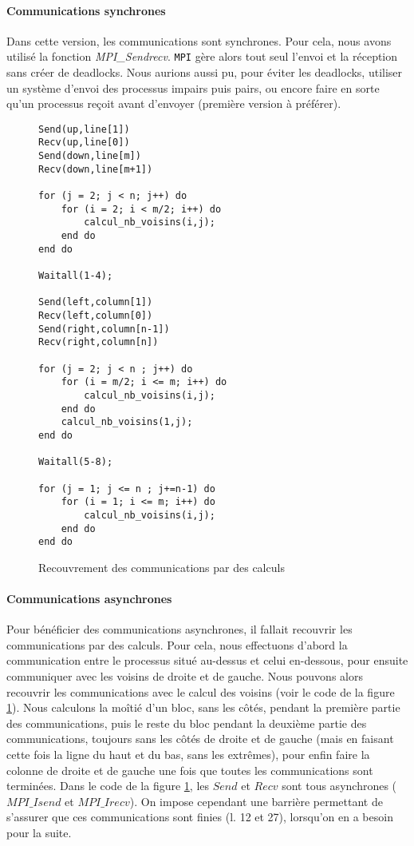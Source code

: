 \paragraph{Communications synchrones}
Dans cette version, les communications sont synchrones. Pour cela, nous avons utilisé la fonction \emph{MPI\_Sendrecv}. \texttt{MPI} gère alors tout seul l'envoi et la réception sans créer de deadlocks. Nous aurions aussi pu, pour éviter les deadlocks, utiliser un système d'envoi des processus impairs puis pairs, ou encore faire en sorte qu'un processus reçoit avant d'envoyer (première version à préférer). 

\begin{figure}[!ht]
\begin{lstlisting}
Send(up,line[1])
Recv(up,line[0])
Send(down,line[m])
Recv(down,line[m+1])

for (j = 2; j < n; j++) do
	for (i = 2; i < m/2; i++) do
		calcul_nb_voisins(i,j);
	end do
end do

Waitall(1-4);

Send(left,column[1])
Recv(left,column[0])
Send(right,column[n-1])
Recv(right,column[n])

for (j = 2; j < n ; j++) do
	for (i = m/2; i <= m; i++) do
		calcul_nb_voisins(i,j);
	end do
	calcul_nb_voisins(1,j);
end do

Waitall(5-8);

for (j = 1; j <= n ; j+=n-1) do
	for (i = 1; i <= m; i++) do
		calcul_nb_voisins(i,j);
	end do
end do
\end{lstlisting}
\caption{Recouvrement des communications par des calculs}
\label{recouvrement}
\end{figure}


\paragraph{Communications asynchrones}
Pour bénéficier des communications asynchrones, il fallait recouvrir les communications par des calculs. Pour cela, nous effectuons d'abord la communication entre le processus situé au-dessus et celui en-dessous, pour ensuite communiquer avec les voisins de droite et de gauche. Nous pouvons alors recouvrir les communications avec le calcul des voisins (voir le code de la figure \ref{recouvrement}). 
Nous calculons la moîtié d'un bloc, sans les côtés, pendant la première partie des communications, puis le reste du bloc pendant la deuxième partie des communications, toujours sans les côtés de droite et de gauche (mais en faisant cette fois la ligne du haut et du bas, sans les extrêmes), pour enfin faire la colonne de droite et de gauche une fois que toutes les communications sont terminées. 
Dans le code de la figure \ref{recouvrement}, les $Send$ et $Recv$ sont tous asynchrones ($MPI\_Isend$ et $MPI\_Irecv$). On impose cependant une barrière permettant de s'assurer que ces communications sont finies (l. 12 et 27), lorsqu'on en a besoin pour la suite.

